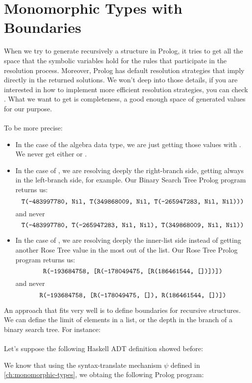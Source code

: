 \section{Monomorphic Types with Boundaries} \label{ch:monomorphic-types-boundaries}

When we try to generate recursively a structure in Prolog, it tries to get all the space that the symbolic variables hold for the rules that participate in the resolution process. Moreover, Prolog has default resolution strategies that imply directly in the returned solutions. We won't deep into those details, if you are interested in how to implement more efficient resolution strategies, you can check \cite{effgenttransf}. What we want to get is completeness, a good enough space of generated values for our purpose.\\\\
To be more precise:
\begin{itemize}
	\item In the case of the  algebra data type, we are just getting those values with . We never get either  or .
	\item In the case of , we are resolving deeply the right-branch side, getting always  in the left-branch side, for example. Our Binary Search Tree Prolog program returns us: $$\texttt{T(-483997780, Nil, T(349868009, Nil, T(-265947283, Nil, Nil)))}$$ and never $$\texttt{T(-483997780, T(-265947283, Nil, Nil), T(349868009, Nil, Nil))}$$
	\item In the case of , we are resolving deeply the inner-list side instead of getting another Rose Tree value in the most out of the list. Our Rose Tree Prolog program returns us: $$\texttt{R(-193684758, [R(-178049475, [R(186461544, [])])])}$$ and never $$\texttt{R(-193684758, [R(-178049475, []), R(186461544, [])])}$$
\end{itemize}
An approach that fits very well is to define boundaries for recursive structures. We can define the limit of elements in a list, or the depth in the branch of a binary search tree. For instance:\\\\
Let's suppose the following Haskell ADT definition showed before:

We know that using the syntax-translate mechanism $\psi$ defined in \ref{ch:monomorphic-types}, we obtaing the following Prolog program:
